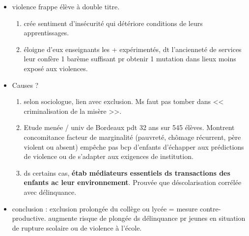 \documentclass[12pt]{article}
\begin{document}
\begin{itemize}
\vspace{0.5cm}

\item  violence frappe élève à double titre.
\begin{enumerate}
\item crée sentiment d'insécurité qui détériore conditions de leurs apprentissages.\\
\item éloigne d'eux enseignants les + expérimentés, dt l'ancienneté de services leur confère 1 barème suffisant pr obtenir 1 mutation dans lieux moins exposé aux violences.\\
\end{enumerate}

\item Causes ?
\begin{enumerate}
\item selon sociologue, lien avec exclusion. Ms faut pas tomber dans << criminalisation de la misère >>.
\item Etude menée / univ  de Bordeaux pdt 32 ans sur 545 élèves. Montrent concomitance facteur de marginalité (pauvreté, chômage récurrent, père violent ou absent) empêche pas bcp d'enfants d'échapper aux prédictions de violence ou de s'adapter aux exigences de institution.\\
\item ds certains cas, \textbf{étab médiateurs essentiels ds transactions des enfants ac leur environnement}. Prouvée que déscolarisation corrélée avec délinquance.
\end{enumerate}

\vspace{0.5cm}

 \item conclusion : exclusion prolongée du collège ou lycée = mesure contre-productive. augmente risque de plongée ds délinquance pr jeunes en situation de rupture scolaire ou de violence à l'école.\\



\end{itemize}
\end{document}
